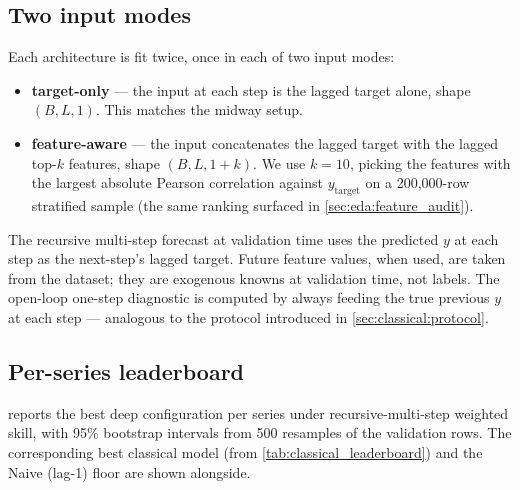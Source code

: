 \subsection{Two input modes}
\label{sec:deep:modes}

Each architecture is fit twice, once in each of two input modes:

\begin{itemize}
  \item \textbf{target-only} --- the input at each step is the lagged target alone, shape $(B, L, 1)$. This matches the midway setup.
  \item \textbf{feature-aware} --- the input concatenates the lagged target with the lagged top-$k$ features, shape $(B, L, 1 + k)$. We use $k = 10$, picking the features with the largest absolute Pearson correlation against $y_{\text{target}}$ on a 200{,}000-row stratified sample (the same ranking surfaced in \cref{sec:eda:feature_audit}).
\end{itemize}

The recursive multi-step forecast at validation time uses the predicted $y$ at each step as the next-step's lagged target. Future feature values, when used, are taken from the dataset; they are exogenous knowns at validation time, not labels. The open-loop one-step diagnostic is computed by always feeding the true previous $y$ at each step --- analogous to the protocol introduced in \cref{sec:classical:protocol}.

\subsection{Per-series leaderboard}
\label{sec:deep:leaderboard}

 reports the best deep configuration per series under recursive-multi-step weighted skill, with 95\% bootstrap intervals from 500 resamples of the validation rows. The corresponding best classical model (from \cref{tab:classical_leaderboard}) and the Naive (lag-1) floor are shown alongside.


